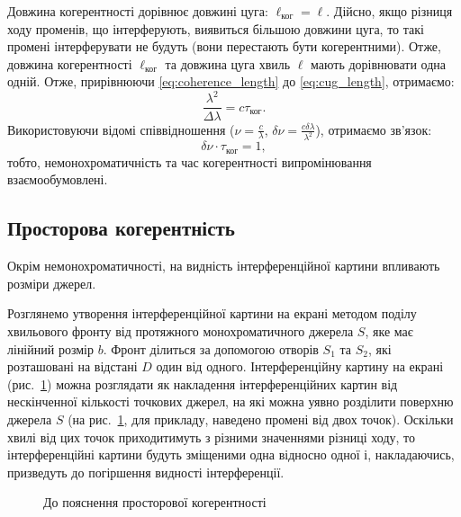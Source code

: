 Довжина когерентності дорівнює довжині цуга: $\ell_\text{ког} = \ell$. Дійсно, якщо різниця ходу променів, що інтерферують,
виявиться більшою довжини цуга, то такі промені інтерферувати
не будуть (вони перестають бути когерентними). Отже, довжина
когерентності $ \ell_\text{ког} $ та довжина цуга хвиль $\ell $ мають дорівнювати одна одній. Отже, прирівнюючи \eqref{eq:coherence_length} до \eqref{eq:cug_length}, отримаємо:
\begin{equation*}
	\frac{\lambda^2}{\Delta\lambda}  = c\tau_\text{ког}.
\end{equation*}
Використовуючи відомі співвідношення ($\nu = \frac{c}{\lambda}$, $\delta\nu = \frac{c\delta\lambda}{\lambda^2}$), отримаємо зв'язок:
\begin{equation*}
	\delta\nu\cdot\tau_\text{ког} = 1,
\end{equation*}
тобто, немонохроматичність та час когерентності
випромінювання взаємообумовлені.




\subsection*{Просторова когерентність}



Окрім немонохроматичності, на видність інтерференційної картини впливають розміри джерел.

Розглянемо утворення інтерференційної картини на екрані методом поділу хвильового фронту від протяжного монохроматичного джерела $ S $, яке має лінійний розмір $ b $. Фронт ділиться за допомогою отворів $ S_1 $ та $ S_2 $, які розташовані на відстані $ D $ один від одного. Інтерференційну картину на екрані (рис.~\ref{pic:space_coherence}) можна розглядати як накладення інтерференційних картин від нескінченної кількості  точкових джерел, на які можна уявно розділити поверхню джерела $ S $ (на рис.~\ref{pic:space_coherence}, для прикладу, наведено промені від двох  точок). Оскільки хвилі від цих точок приходитимуть з різними значеннями різниці ходу, то інтерференційні картини будуть зміщеними одна відносно одної і, накладаючись, призведуть до погіршення видності інтерференції.

\begin{figure}[h!]\centering
    
	\caption{До пояснення просторової когерентності}
    \label{pic:space_coherence}
\end{figure}


